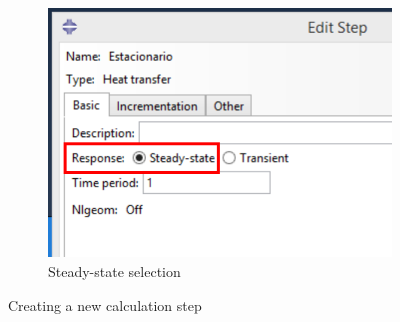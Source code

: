 \begin{figure}[!h]
\begin{subfigure}[!h]{0.39\textwidth}
      \includegraphics[width=\textwidth]{./body/images/step03.pdf}
      \caption{Steady-state selection}
      \label{step03}
    \end{subfigure}%
    \caption{Creating a new calculation step}
  \end{figure}

